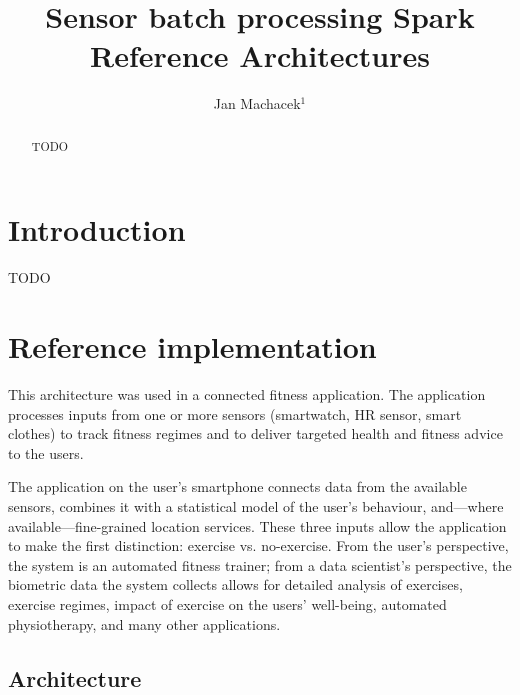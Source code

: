 \documentclass[a4paper, 10 pt, conference]{IEEEtran}
\title{\LARGE \bf
Sensor batch processing Spark Reference Architectures
}
\author{Jan Machacek$^{1}$%
}
\begin{document}
\maketitle
\thispagestyle{empty}
\pagestyle{empty}

\begin{abstract}

TODO

\end{abstract}


\section{Introduction}

TODO

\section{Reference implementation}

This architecture was used in a connected fitness application. The application processes inputs from one or more sensors (smartwatch, HR sensor, smart clothes) to track fitness regimes and to deliver targeted health and fitness advice to the users. 

The application on the user's smartphone connects data from the available sensors, combines it with a statistical model of the user's behaviour, and---where available---fine-grained location services. These three inputs allow the application to make the first distinction: exercise vs. no-exercise. From the user's perspective, the system is an automated fitness trainer; from a data scientist's perspective, the biometric data the system collects allows for detailed analysis of exercises, exercise regimes, impact of exercise on the users' well-being, automated physiotherapy, and many other applications.

\subsection{Architecture}
\end{document}
